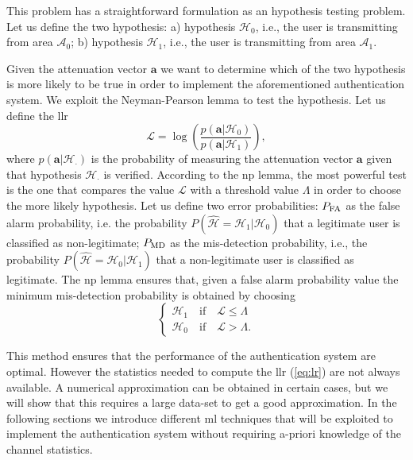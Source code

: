 \documentclass[draftcls,onecolumn,12pt]{IEEEtran}
\begin{document}
This problem has a straightforward formulation as an hypothesis testing problem. Let us define the two hypothesis: a) hypothesis $\mathcal{H}_0$, i.e., the user is transmitting from area $\mathcal{A}_0$; b) hypothesis $\mathcal{H}_1$, i.e., the user is transmitting from area $\mathcal{A}_1$.

Given the attenuation vector $\bm{a}$ we want to determine which of the two hypothesis is more likely to be true in order to implement the aforementioned authentication system. 
We exploit the Neyman-Pearson lemma to test the hypothesis. Let us define the \ac{llr}
\begin{equation}\label{eq:lr}
    \mathcal{L}=\log\left(\frac{p(\bm{a}|\mathcal{H}_0)}{p(\bm{a}|\mathcal{H}_1)}\right),
\end{equation}
where $p(\bm{a}|\mathcal{H}_{\cdot})$ is the probability of measuring the attenuation vector $\bm{a}$ given that hypothesis $\mathcal{H}_\cdot$ is verified. According to the \ac{np} lemma, the most powerful test is the one that compares the value $\mathcal{L}$ with a threshold value $\Lambda$ in order to choose the more likely hypothesis. Let us define two error probabilities: $P_{\rm FA}$ as the false alarm probability, i.e. the probability $P(\hat{\mathcal H} = \mathcal H_1 | \mathcal H_0)$ that a legitimate user is classified as non-legitimate; $P_{\rm MD}$ as the mis-detection probability, i.e., the probability $P(\hat{\mathcal H} = \mathcal H_0 | \mathcal H_1)$ that a non-legitimate user is classified as legitimate. The \ac{np} lemma ensures that, given a false alarm probability value the minimum mis-detection probability is obtained by choosing
\begin{equation}
    \begin{cases}
    \mathcal{H}_1 \quad\text{if} \quad \mathcal{L} \le \Lambda \\
    \mathcal{H}_0  \quad\text{if} \quad \mathcal{L} > \Lambda.
    \end{cases}
\end{equation}

This method ensures that the performance of the authentication system are optimal. However the statistics needed to compute the \ac{llr} (\ref{eq:lr}) are not always available. A numerical approximation can be obtained in certain cases, but we will show  that this requires a large data-set to get a good approximation. In the following sections we introduce different \ac{ml} techniques that will be exploited to implement the authentication system without requiring a-priori knowledge of the channel statistics.
\end{document}
